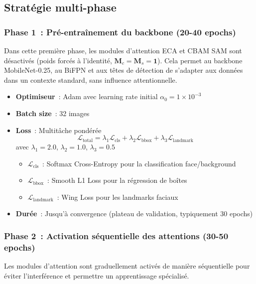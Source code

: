 \begin{onehalfspace}
\subsection{Stratégie multi-phase}

\subsubsection{Phase 1~: Pré-entraînement du backbone (20-40 epochs)}

\hspace{0.65 cm}Dans cette première phase, les modules d'attention ECA et CBAM SAM sont désactivés (poids forcés à l'identité, $\mathbf{M}_c = \mathbf{M}_s = \mathbf{1}$). Cela permet au backbone MobileNet-0.25, au BiFPN et aux têtes de détection de s'adapter aux données dans un contexte standard, sans influence attentionnelle.

\begin{itemize}
\item \textbf{Optimiseur}~: Adam \cite{Kingma2015Adam} avec learning rate initial $\alpha_0 = 1 \times 10^{-3}$
\item \textbf{Batch size}~: 32 images
\item \textbf{Loss}~: Multitâche pondérée
   \[
   \mathcal{L}_{\text{total}} = \lambda_1 \mathcal{L}_{\text{cls}} + \lambda_2 \mathcal{L}_{\text{bbox}} + \lambda_3 \mathcal{L}_{\text{landmark}}
   \]
   avec $\lambda_1 = 2.0$, $\lambda_2 = 1.0$, $\lambda_3 = 0.5$ \cite{Kim2025FeatherFace}
   \begin{itemize}
   \item $\mathcal{L}_{\text{cls}}$~: Softmax Cross-Entropy pour la classification face/background
   \item $\mathcal{L}_{\text{bbox}}$~: Smooth L1 Loss pour la régression de boîtes
   \item $\mathcal{L}_{\text{landmark}}$~: Wing Loss pour les landmarks faciaux \cite{Feng2018WingLoss}
   \end{itemize}
\item \textbf{Durée}~: Jusqu'à convergence (plateau de validation, typiquement 30 epochs)
\end{itemize}

\subsubsection{Phase 2~: Activation séquentielle des attentions (30-50 epochs)}

\hspace{0.65 cm}Les modules d'attention sont graduellement activés de manière séquentielle pour éviter l'interférence et permettre un apprentissage spécialisé.


\end{onehalfspace}
